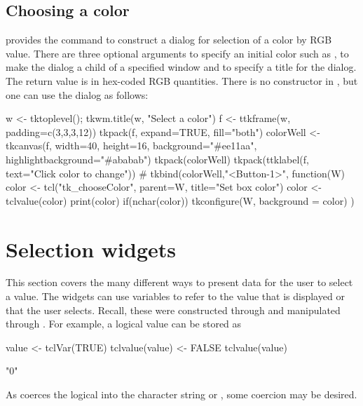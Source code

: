 \subsection{Choosing a color}
\Tk\/ provides the command  to construct a dialog for selection of a color by RGB value. There are three optional arguments  to specify an initial color such as ,  to make the dialog a child of a specified window and  to specify a title for the dialog. The return value is in hex-coded RGB quantities. 
There is no constructor in , but one can use the dialog as follows:
\begin{Schunk}
\begin{Sinput}
 w <- tktoplevel(); tkwm.title(w, "Select a color")
 f <- ttkframe(w, padding=c(3,3,3,12))
 tkpack(f, expand=TRUE, fill="both")
 colorWell <- tkcanvas(f, width=40, height=16, 
                       background="#ee11aa",
                       highlightbackground="#ababab") 
 tkpack(colorWell)
 tkpack(ttklabel(f, text="Click color to change"))
 #
 tkbind(colorWell,"<Button-1>", function(W) {
   color <- tcl("tk_chooseColor", parent=W, 
                title="Set box color")
   color <- tclvalue(color)
   print(color)
   if(nchar(color))
     tkconfigure(W, background = color)
 })
\end{Sinput}
\end{Schunk}



\section{Selection widgets}
\label{sec:tcltk:selection-widgets}

This section covers the many different ways to present data for the
user to select a value. The widgets can use \TCL\/ variables to refer
to the value that is displayed or that the user selects.  Recall,
these were constructed through  and manipulated
through .  For example, a logical value can be stored as
\begin{Schunk}
\begin{Sinput}
 value <- tclVar(TRUE)
 tclvalue(value) <- FALSE
 tclvalue(value)
\end{Sinput}
\begin{Soutput}
[1] "0"
\end{Soutput}
\end{Schunk}
As  coerces the logical into the  character string   or , some coercion may be desired.



